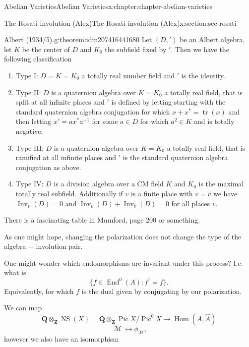 \documentclass[oneside,10pt,]{book}
\numberwithin{equation}{section}
\newcommand{\sheaf}[1]{\operatorname{\mathcal{#1}}}
\newcommand{\ZZ}{\mathbf{Z}}
\newcommand{\QQ}{\mathbf{Q}}
\DeclareMathOperator{\End}{End}
\DeclareMathOperator{\Hom}{Hom}
\DeclareMathOperator{\Pic}{Pic}
\DeclareMathOperator{\tr}{tr}
\DeclareMathOperator{\NS}{NS}
\begin{document}
\begin{chapterptx}{Abelian Varieties}{}{Abelian Varieties}{}{}{x:chapter:chapter-abelian-varieties}
\begin{sectionptx}{The Rosati involution (Alex)}{}{The Rosati involution (Alex)}{}{}{x:section:sec-rosati}
\begin{theorem}{Albert (1934\slash{}5).}{}{g:theorem:idm207416441680}%
Let \((D, ')\) be an Albert algebra, let \(K\) be the center of \(D\) and \(K_0\) the subfield fixed by \('\). Then we have the following classification%
\begin{enumerate}
\item{}Type I: \(D = K = K_0\) a totally real number field and \('\) is the identity.%
\item{}Type II: \(D\) is a quaternion algebra over \(K = K_0\) a totally real field, that is split at all infinite places and \('\) is defined by letting starting with the standard quaternion algebra conjugation for which \(x + x^* = \tr(x)\) and then letting \(x' = ax^* a^{-1}\) for some \(a \in D\) for which \(a^2 \in K\) and is totally negative.%
\item{}Type III: \(D\) is a quaternion algebra over \(K = K_0\) a totally real field, that is ramified at all infinite places and \('\) is the standard quaternion algebra conjugation as above.%
\item{}Type IV: \(D\) is a division algebra over a CM field \(K\) and \(K_0\) is the maximal totally real subfield. Additionally if \(v\) is a finite place with \(v = \bar v\) we have \(\operatorname{Inv}_v(D) = 0\) and \(\operatorname{Inv}_v(D) + \operatorname{Inv}_{\bar v}(D) = 0\) for all places \(v\).%
\end{enumerate}
%
\end{theorem}
There is a fascinating table in Mumford, page 200 or something.%
\par
As one might hope, changing the polarization does not change the type of the algebra + involution pair.%
\par
One might wonder which endomorphisms are invariant under this process? I.e. what is%
\begin{equation*}
\{f \in \End^0(A) : f^\dagger = f\}\text{.}
\end{equation*}
Equivalently, for which \(f\) is the dual given by conjugating by our polarization.%
\par
We can map%
\begin{equation*}
\QQ \otimes_\ZZ \NS(X) = \QQ \otimes_\ZZ \Pic X/\Pic^0 X \to \Hom(A, \hat A)
\end{equation*}
%
\begin{equation*}
\sheaf M \mapsto \phi_{\sheaf M}\text{,}
\end{equation*}
however we also have an isomorphism%
\begin{equation*}

\end{equation*}
\end{sectionptx}
\end{chapterptx}
\end{document}
